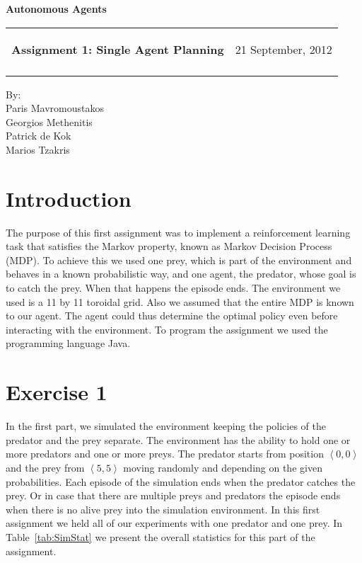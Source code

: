 \documentclass[a4paper,11pt]{article}
\makeatletter
\newcommand{\resheading}[1]{{\large \colorbox{mygrey}{\begin{minipage}{\textwidth}{\textbf{#1 \vphantom{p\^{E}}}}\end{minipage}}}}
\newcommand{\mywebheader}{
  \begin{tabular}{@{}p{5in}p{4in}}
  {\resheading{Assignment 1: Single Agent Planning}} & {\Large 21 September, 2012}\\\vspace{0.2cm}
  \end{tabular}}
\makeatother
\begin{document}
\begin{center}
{\LARGE \textbf{Autonomous Agents}}\\ [1em]
\end{center}
\mywebheader

\begin{center}
{\Large By:} \\ \vspace{0.1cm}
{\Large Paris Mavromoustakos} \\  \vspace{0.1cm}
{\Large Georgios Methenitis} \\ \vspace{0.1cm}
{\Large Patrick de Kok} \\ \vspace{0.1cm}
{\Large Marios Tzakris}
\end{center}




\section*{Introduction}
The purpose of this first assignment was to implement a reinforcement learning task that satisfies the Markov property, known as Markov Decision Process (MDP). To achieve this we used one prey, which is part of the environment and behaves in a known probabilistic way, and one agent, the predator, whose goal is to catch the prey. When that happens the episode ends. The environment we used is a 11 by 11 toroidal grid. Also we assumed that the entire MDP is known to our agent. The agent could thus determine the optimal policy even before interacting with the environment. To program the assignment we used the programming language Java.

\section*{Exercise 1}
In the first part, we simulated the environment keeping the policies of the predator and the prey separate. The environment has the ability to hold one or more predators and one or more preys. The predator starts from position $\left<0,0\right>$ and the prey from $\left<5,5\right>$ moving randomly and depending on the given probabilities. Each episode of the simulation ends when the predator catches the prey. Or in case that there are multiple preys and predators the episode ends when there is no alive prey into the simulation environment. In this first assignment we held all of our experiments with one predator and one prey. In Table~\ref{tab:SimStat} we present the overall statistics for this part of the assignment.
\end{document}
